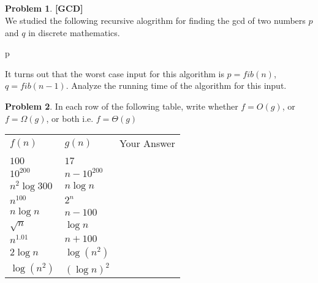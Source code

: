 \documentclass{article}
\theoremstyle{definition}
\newtheorem{Q}{Problem}
\newcommand{\code}[2]{\begin{algorithm}[H]\caption{: #1}\begin{algorithmic}#2\end{algorithmic}\end{algorithm}}
\begin{document}
\\
\\\\
\\


\pagebreak

\begin{Q}
\textbf{[GCD]}\\
 We studied the following recursive alogrithm for finding the gcd of two numbers $p$ and $q$ in discrete mathematics. 
 \code{}
 {
      \State \Return p
    \Else
      \State \Return \Call{gcd}{q, $p \mod q$}
     \EndIf
 \EndFunction
 }
 It turns out that the worst case input for this algorithm is $p=fib(n)$, $q=fib(n-1)$. Analyze the running time of the algorithm for this input.
\end{Q}




\begin{Q} 
In each row of the following table, write whether $f = O(g)$, or $f=\Omega(g)$, or both i.e. $f=\Theta(g)$
\begin{table}[H]
\centering
\begin{tabular}{|l|l|c|}
\hline \hspace{.2in}$f(n)$\hspace{.3in} & \hspace{.2in}$g(n)$\hspace{.3in} & \hskip1in Your Answer \hspace{1in} \\&& \\ \hline
$100$ & $17$ & \\ [8pt]\hline
$10^{200}$ & $n-10^{200}$ &\\[8pt]\hline
$n^2\log 300$ & $ n\log n$ &\\[8pt]\hline
$n^{100}$ & $2^n$ & \\[8pt]\hline
$n\log n$ & $n-100$ &\\[8pt]\hline
$\sqrt{n}$ & $\log n$ &\\[8pt]\hline
$n^{1.01}$ & $n+100$ &\\[8pt]\hline
$2\log n$ & $\log(n^2)$ &\\[8pt]\hline
$\log(n^2)$ & $(\log n)^2$ &\\[8pt]\hline
\end{tabular}
\end{table}
\end{Q}
\end{document}

